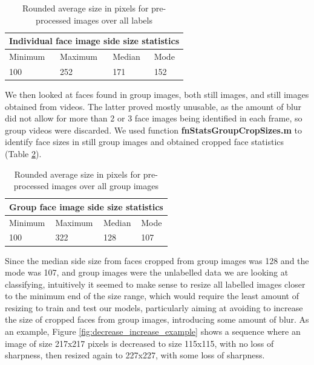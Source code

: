 \begin{table}[h]
\centering
\begin{tabular}{|l|l|l|l|}
\hline
\multicolumn{4}{|l|}{Individual face image side size statistics} \\ \hline
Minimum  &  Maximum & Median & Mode \\ \hline
100 & 252 & 171 & 152 \\ \hline
\end{tabular}
\caption{Rounded average size in pixels for pre-processed images over all labels}
\label{table:face_crop_stats}
\end{table}

We then looked at faces found in group images, both still images, and still images obtained from videos. The latter proved mostly unusable, as the amount of blur did not allow for more than 2 or 3 face images being identified in each frame, so group videos were discarded. We used function \textbf{fnStatsGroupCropSizes.m} to identify face sizes in still group images and obtained cropped face statistics (Table \ref{table:group_crop_stats}).

\begin{table}[h]
\centering
\begin{tabular}{|l|l|l|l|}
\hline
\multicolumn{4}{|l|}{Group face image side size statistics} \\ \hline
Minimum  &  Maximum & Median & Mode \\ \hline
100 & 322 & 128 & 107 \\ \hline
\end{tabular}
\caption{Rounded average size in pixels for pre-processed images over all group images}
\label{table:group_crop_stats}
\end{table}

Since the median side size from faces cropped from group images was 128 and the mode was 107, and group images were the unlabelled data we are looking at classifying, intuitively it seemed to make sense to resize all labelled images closer to the minimum end of the size range, which would require the least amount of resizing to train and test our models, particularly aiming at avoiding to increase the size of cropped faces from group images, introducing some amount of blur. As an example, Figure \ref{fig:decrease_increase_example} shows a sequence where an image of size 217x217 pixels is decreased to size 115x115, with no loss of sharpness, then resized again to 227x227, with some loss of sharpness.

